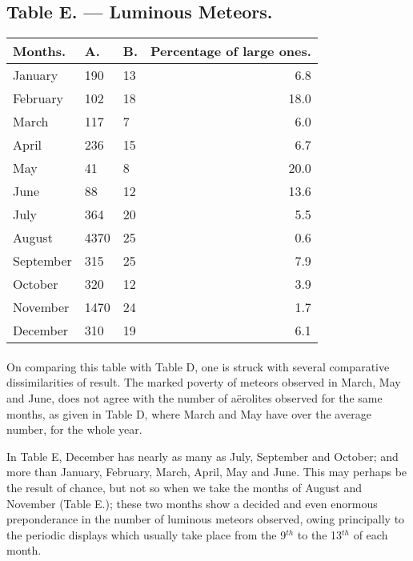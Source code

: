 \documentclass[a4paper, 12pt, oneside]{article}
\begin{document}
\subsection{Table E. --- Luminous Meteors.}
\begin{table}[H]
    \centering
    \begin{tabular}{|l|l|l|r|}
    \hline
         Months. & A. & B. & Percentage of large ones. \\ \hline
        January & 190 & 13 & 6.8 \\ \hline
        February & 102 & 18 & 18.0 \\ \hline
        March & 117 & 7 & 6.0 \\ \hline
        April & 236 & 15 & 6.7 \\ \hline
        May & 41 & 8 & 20.0 \\ \hline
        June & 88 & 12 & 13.6 \\ \hline
        July & 364 & 20 & 5.5 \\ \hline
        August & 4370 & 25 & 0.6 \\ \hline
        September & 315 & 25 & 7.9 \\ \hline
        October & 320 & 12 & 3.9 \\ \hline
        November & 1470 & 24 & 1.7 \\ \hline
        December & 310 & 19 & 6.1 \\ \hline
    \end{tabular}
\end{table}
\paragraph{}
On comparing this table with Table D, one is struck with several comparative dissimilarities of result. The marked poverty of meteors observed in March, May and June, does not agree with the number of aërolites observed for the same months, as given in Table D, where March and May have over the average number, for the whole year.

In Table E, December has nearly as many as July, September and October; and more than January, February, March, April, May and June. This may perhaps be the result of chance, but not so when we take the months of August and November (Table E.); these two months show a decided and even enormous preponderance in the number of luminous meteors observed, owing principally to the periodic displays which usually take place from the 9$^{th}$ to the 13$^{th}$ of each month.
\end{document}
